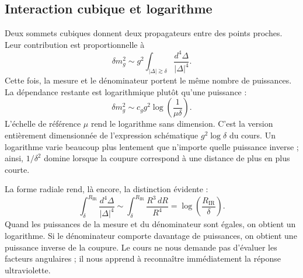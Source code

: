 \subsection{Interaction cubique et logarithme}

Deux sommets cubiques donnent deux propagateurs entre des points proches. Leur contribution est proportionnelle à
\begin{equation}
\delta m_g^2
\sim
g^2\int_{|\Delta|\gtrsim\delta}
\frac{d^4\Delta}{|\Delta|^4}.
\label{eq:cubic-loop}
\end{equation}
Cette fois, la mesure et le dénominateur portent le même nombre de puissances. La dépendance restante est logarithmique plutôt qu’une puissance :
\begin{equation}
\delta m_g^2
\sim
c_g g^2\log\!\left(\frac{1}{\mu\delta}\right).
\label{eq:cubic-log}
\end{equation}
L’échelle de référence \(\mu\) rend le logarithme sans dimension. C’est la version entièrement dimensionnée de l’expression schématique \(g^2\log\delta\) du cours. Un logarithme varie beaucoup plus lentement que n’importe quelle puissance inverse ; ainsi, \(1/\delta^2\) domine lorsque la coupure correspond à une distance de plus en plus courte.

La forme radiale rend, là encore, la distinction évidente :
\begin{equation}
\int_{\delta}^{R_{\mathrm{IR}}}
\frac{d^4\Delta}{|\Delta|^4}
\sim
\int_{\delta}^{R_{\mathrm{IR}}}\frac{R^3\,dR}{R^4}
=\log\!\left(\frac{R_{\mathrm{IR}}}{\delta}\right).
\end{equation}
Quand les puissances de la mesure et du dénominateur sont égales, on obtient un logarithme. Si le dénominateur comporte davantage de puissances, on obtient une puissance inverse de la coupure. Le cours ne nous demande pas d’évaluer les facteurs angulaires ; il nous apprend à reconnaître immédiatement la réponse ultraviolette.

\begin{classroomqa}
\end{classroomqa}

\begin{classroomqa}
\end{classroomqa}

